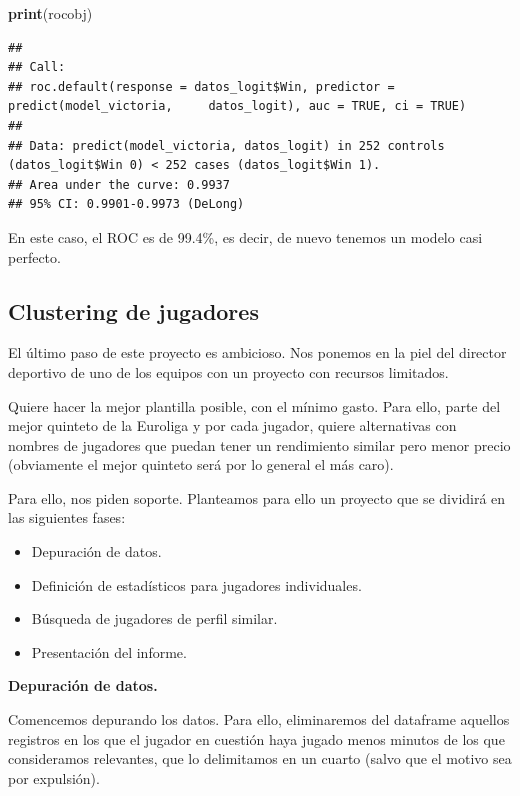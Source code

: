 \documentclass[
]{article}
\newenvironment{Shaded}{\begin{snugshade}}{\end{snugshade}}
\newcommand{\KeywordTok}[1]{\textcolor[rgb]{0.13,0.29,0.53}{\textbf{#1}}}
\newcommand{\NormalTok}[1]{#1}
\providecommand{\tightlist}{%
  \setlength{\itemsep}{0pt}\setlength{\parskip}{0pt}}
\begin{document}
\begin{Shaded}
\begin{Highlighting}[]
\KeywordTok{print}\NormalTok{(rocobj)}
\end{Highlighting}
\end{Shaded}

\begin{verbatim}
## 
## Call:
## roc.default(response = datos_logit$Win, predictor = predict(model_victoria,     datos_logit), auc = TRUE, ci = TRUE)
## 
## Data: predict(model_victoria, datos_logit) in 252 controls (datos_logit$Win 0) < 252 cases (datos_logit$Win 1).
## Area under the curve: 0.9937
## 95% CI: 0.9901-0.9973 (DeLong)
\end{verbatim}

En este caso, el ROC es de 99.4\%, es decir, de nuevo tenemos un modelo
casi perfecto.

\hypertarget{clustering-de-jugadores}{%
\subsection{Clustering de jugadores}\label{clustering-de-jugadores}}

El último paso de este proyecto es ambicioso. Nos ponemos en la piel del
director deportivo de uno de los equipos con un proyecto con recursos
limitados.

Quiere hacer la mejor plantilla posible, con el mínimo gasto. Para ello,
parte del mejor quinteto de la Euroliga y por cada jugador, quiere
alternativas con nombres de jugadores que puedan tener un rendimiento
similar pero menor precio (obviamente el mejor quinteto será por lo
general el más caro).

Para ello, nos piden soporte. Planteamos para ello un proyecto que se
dividirá en las siguientes fases:

\begin{itemize}
\tightlist
\item
  Depuración de datos.
\item
  Definición de estadísticos para jugadores individuales.
\item
  Búsqueda de jugadores de perfil similar.
\item
  Presentación del informe.
\end{itemize}

\textbf{Depuración de datos.}

Comencemos depurando los datos. Para ello, eliminaremos del dataframe
aquellos registros en los que el jugador en cuestión haya jugado menos
minutos de los que consideramos relevantes, que lo delimitamos en un
cuarto (salvo que el motivo sea por expulsión).
\end{document}
